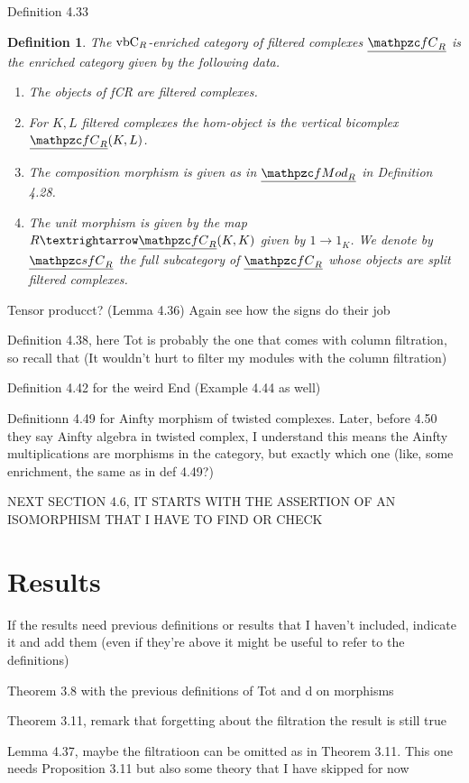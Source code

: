 \documentclass[twoside]{article}
\newtheorem{defin}{Definition}[section]
\begin{document}
Definition 4.33
\begin{defin}
The $\mathrm{vbC}_R$-enriched category of filtered complexes $\ufC$ is the enriched category given
by the following data.
\begin{enumerate}[(1)]
\item The objects of fCR are filtered complexes.
\item For $K,L$ filtered complexes the hom-object is the vertical bicomplex $\ufC(K,L)$.
\item The composition morphism is given as in $\ufMod$ in Definition 4.28.
\item The unit morphism is given by the map $R → \ufC(K,K)$ given by $1 → 1_K$.
We denote by $\usfC$ the full subcategory of $\ufC$ whose objects are split filtered complexes.

\end{enumerate}
\end{defin}

Tensor producct? (Lemma 4.36) Again see how the signs do their job

Definition 4.38, here Tot is probably the one that comes with column filtration, so recall that (It wouldn't hurt to filter my modules with the column filtration)

Definition 4.42 for the weird End (Example 4.44 as well)

Definitionn 4.49 for Ainfty morphism of twisted complexes. Later, before 4.50 they say Ainfty algebra in twisted complex, I understand this means the Ainfty multiplications are morphisms in the category, but exactly which one (like, some enrichment, the same as in def 4.49?)

NEXT SECTION 4.6, IT STARTS WITH THE ASSERTION OF AN ISOMORPHISM THAT I HAVE TO FIND OR CHECK
\section{Results}
If the results need previous definitions or results that I haven't included, indicate it and add them (even if they're above it might be useful to refer to the definitions)


Theorem 3.8 with the previous definitions of Tot and d on morphisms

Theorem 3.11, remark that forgetting about the filtration the result is still true

Lemma 4.37, maybe the filtratioon can be omitted as in Theorem 3.11. This one needs Proposition 3.11 but also some theory that I have skipped for now
\end{document}
